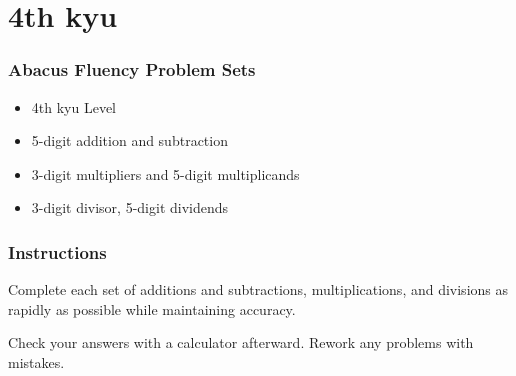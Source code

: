 \hypertarget{th-kyu}{%
\section{4th kyu}\label{th-kyu}}

\hypertarget{abacus-fluency-problem-sets}{%
\subsubsection{Abacus Fluency Problem
Sets}\label{abacus-fluency-problem-sets}}

\begin{itemize}
\item
  4th kyu Level
\item
  5-digit addition and subtraction
\item
  3-digit multipliers and 5-digit multiplicands
\item
  3-digit divisor, 5-digit dividends
\end{itemize}

\hypertarget{instructions}{%
\subsubsection{Instructions}\label{instructions}}

Complete each set of additions and subtractions, multiplications, and
divisions as rapidly as possible while maintaining accuracy.

Check your answers with a calculator afterward. Rework any problems with
mistakes.

